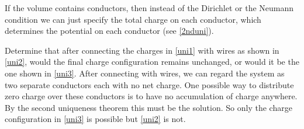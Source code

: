 \documentclass[english,a4paper,12pt]{report}
\begin{document}
If the volume contains conductors, then instead of the Dirichlet or the Neumann condition we can just specify the total charge on each conductor, which determines the potential on each conductor (see \cref{2nduni}). 



{Determine that after connecting the charges in \cref{uni1} with wires as shown in \cref{uni2}, would the final charge configuration remains unchanged, or would it be the one shown in \cref{uni3}.}
{After connecting with wires, we can regard the system as two separate conductors each with no net charge. One possible way to distribute zero charge over these conductors is to have no accumulation of charge anywhere. By the second uniqueness theorem this must be the solution. So only the charge configuration in \cref{uni3} is possible but \cref{uni2} is not. 
} 
\end{document}
